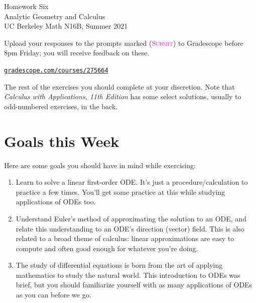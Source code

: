 

\usepackage{fourier}



\pagestyle{empty}




\begin{center}
    {\Huge{Homework Six}}
    \\ \footnotesize{Analytic Geometry and Calculus}
    \\ \footnotesize{UC Berkeley Math N16B, Summer 2021}
\end{center}
\vspace{2em}

Upload your responses to the prompts marked
(\textsc{\textcolor{magenta}{Submit}})
to Gradescope before 8pm Friday; 
you will receive feedback on these.
\begin{center}
    \href{https://www.gradescope.com/courses/275664}%
    {\texttt{gradescope.com/courses/275664}}
\end{center}
The rest of the exercises you should complete at your discretion.
Note that \emph{Calculus with Applications, 11th Edition} 
has some select solutions, usually to odd-numbered exercises, in the back.


\section*{Goals this Week}

Here are some goals you should have in mind while exercising:
\begin{enumerate}
    \item 
        Learn to solve a linear first-order ODE. 
        It's just a procedure/calculation to practice a few times.
        You'll get some practice at this while studying applications of ODEs too.
    \item 
        Understand Euler's method of approximating the solution to an ODE,
        and relate this understanding to an ODE's direction (vector) field.
        This is also related to a broad theme of calculus:
        linear approximations are easy to compute
        and often good enough for whatever you're doing.
    \item 
        The study of differential equations is born from the 
        art of applying mathematics to study the natural world. 
        This introduction to ODEs was brief, but you should
        familiarize yourself with as many applications of ODEs
        as you can before we go.
\end{enumerate}


